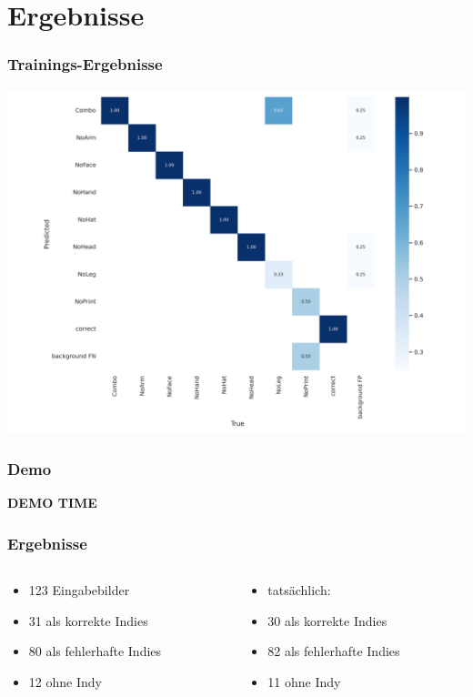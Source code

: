 \documentclass[ignorenonframetext,naustrian,12pt,t]{beamer}
\begin{document}
\section{Ergebnisse}
\begin{frame}
	\frametitle{Trainings-Ergebnisse}
		\centering
		\includegraphics[height=.9\textheight]{../sModel/confusion_matrixV3.png}
\end{frame}

\begin{frame}
	\frametitle{Demo}
		\centering 
		\Huge \textbf{DEMO TIME} \\
\end{frame}

\begin{frame}
	\frametitle{Ergebnisse}
		\centering
	\begin{columns}
     \begin{column}{0.5\textwidth}
		\begin{itemize}[label={\color{myTitleColour}\textbullet}]
		\item 123 Eingabebilder
		\item 31 als korrekte Indies 
		\item 80 als fehlerhafte Indies 
		\item 12 ohne Indy
		\end{itemize}
     \end{column}
     \begin{column}{0.49\textwidth}
		\begin{itemize}[label={\color{myTitleColour}\textbullet}]
		\item tatsächlich:
		\item 30 als korrekte Indies 
		\item 82 als fehlerhafte Indies 
		\item 11 ohne Indy
		\end{itemize}
      \end{column}
	\end{columns}
\end{frame}
	 
\end{document}
